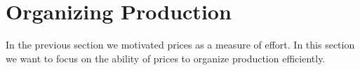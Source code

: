 \section{Organizing Production}

In the previous section we motivated prices as a measure of effort. In this
section we want to focus on the ability of prices to organize production
efficiently.



